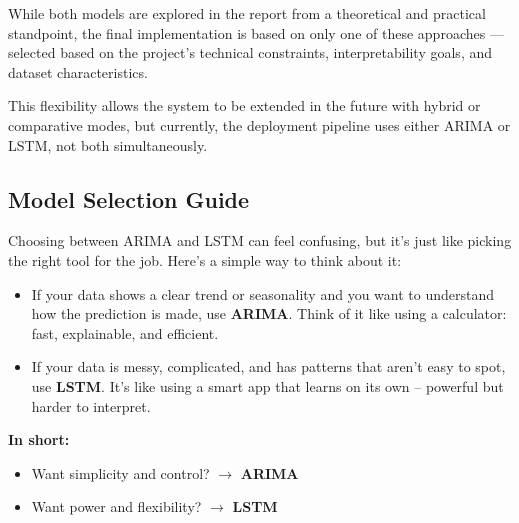 While both models are explored in the report from a theoretical and practical standpoint, the final implementation is based on only one of these approaches — selected based on the project's technical constraints, interpretability goals, and dataset characteristics.

This flexibility allows the system to be extended in the future with hybrid or comparative modes, but currently, the deployment pipeline uses either ARIMA or LSTM, not both simultaneously.

\subsection{Model Selection Guide}

Choosing between ARIMA and LSTM can feel confusing, but it’s just like picking the right tool for the job. Here's a simple way to think about it:

\begin{itemize}
	\item If your data shows a clear trend or seasonality and you want to understand how the prediction is made, use \textbf{ARIMA}. Think of it like using a calculator: fast, explainable, and efficient.
	\item If your data is messy, complicated, and has patterns that aren’t easy to spot, use \textbf{LSTM}. It’s like using a smart app that learns on its own – powerful but harder to interpret.
\end{itemize}

\vspace{0.3cm}
\textbf{In short:}
\begin{itemize}
	\item Want simplicity and control? $\rightarrow$ \textbf{ARIMA}
	\item Want power and flexibility? $\rightarrow$ \textbf{LSTM}
\end{itemize}


\vspace{0.5cm}





